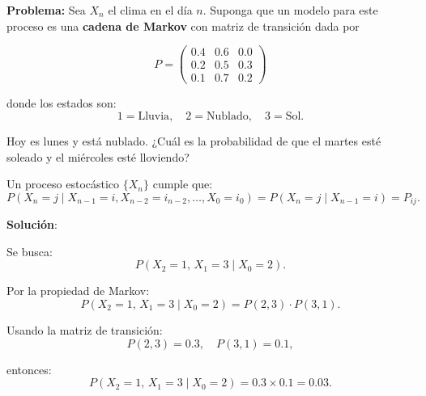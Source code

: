 \documentclass[12pt,a4paper]{article}
\begin{document}
\textbf{Problema:} Sea $X_n$ el clima en el día $n$. Suponga que un modelo para este proceso es una 
\textbf{cadena de Markov} con matriz de transición dada por

\begin{equation*}
P =
\begin{pmatrix}
0.4 & 0.6 & 0.0 \\
0.2 & 0.5 & 0.3 \\
0.1 & 0.7 & 0.2
\end{pmatrix}
\end{equation*}

donde los estados son:
\begin{equation*}
1 = \text{Lluvia}, \quad
2 = \text{Nublado}, \quad
3 = \text{Sol}.
\end{equation*}

Hoy es lunes y está nublado. ¿Cuál es la probabilidad de que el martes esté soleado 
y el miércoles esté lloviendo?

Un proceso estocástico $\{X_n\}$ cumple que:
\begin{equation*}
P(X_n = j \mid X_{n-1} = i, X_{n-2} = i_{n-2}, \ldots, X_0 = i_0) 
= P(X_n = j \mid X_{n-1} = i) = P_{ij}.
\end{equation*}

\textbf{Solución}:

Se busca:
\begin{equation*}
P(X_2 = 1, \, X_1 = 3 \mid X_0 = 2).
\end{equation*}

Por la propiedad de Markov:
\begin{equation*}
P(X_2 = 1, \, X_1 = 3 \mid X_0 = 2) = P(2,3) \cdot P(3,1).
\end{equation*}

Usando la matriz de transición:
\begin{equation*}
P(2,3) = 0.3, \quad P(3,1) = 0.1,
\end{equation*}

entonces:
\begin{equation*}
P(X_2 = 1, \, X_1 = 3 \mid X_0 = 2) = 0.3 \times 0.1 = 0.03.
\end{equation*}

\end{document}
